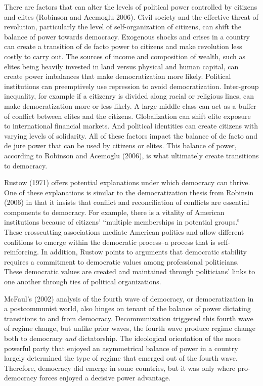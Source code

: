\documentclass[12pt,]{article}
\begin{document}
There are factors that can alter the levels of political power
controlled by citizens and elites (Robinson and Acemoglu 2006). Civil
society and the effective threat of revolution, particularly the level
of self-organization of citizens, can shift the balance of power towards
democracy. Exogenous shocks and crises in a country can create a
transition of de facto power to citizens and make revolution less costly
to carry out. The sources of income and composition of wealth, such as
elites being heavily invested in land versus physical and human capital,
can create power imbalances that make democratization more likely.
Political institutions can preemptively use repression to avoid
democratization. Inter-group inequality, for example if a citizenry is
divided along racial or religious lines, can make democratization
more-or-less likely. A large middle class can act as a buffer of
conflict between elites and the citizens. Globalization can shift elite
exposure to international financial markets. And political identities
can create citizens with varying levels of solidarity. All of these
factors impact the balance of de facto and de jure power that can be
used by citizens or elites. This balance of power, according to Robinson
and Acemoglu (2006), is what ultimately create transitions to democracy.

Rustow (1971) offers potential explanations under which democracy can
thrive. One of these explanations is similar to the democratization
thesis from Robinsin (2006) in that it insists that conflict and
reconciliation of conflicts are essential components to democracy. For
example, there is a vitality of American institutions because of
citizens' ``multiple memberships in potential groups.'' These
crosscutting associations mediate American politics and allow different
coalitions to emerge within the democratic process--a process that is
self-reinforcing. In addition, Rustow points to arguments that
democratic stability requires a commitment to democratic values among
professional politicians. These democratic values are created and
maintained through politicians' links to one another through ties of
political organizations.

McFaul's (2002) analysis of the fourth wave of democracy, or
democratization in a postcommunist world, also hinges on tenant of the
balance of power dictating transitions to and from democracy.
Decommunization triggered this fourth wave of regime change, but unlike
prior waves, the fourth wave produce regime change both to democracy
\emph{and} dictatorship. The ideological orientation of the more
powerful party that enjoyed an asymmetrical balance of power in a
country largely determined the type of regime that emerged out of the
fourth wave. Therefore, democracy did emerge in some countries, but it
was only where pro-democracy forces enjoyed a decisive power advantage.
\end{document}
